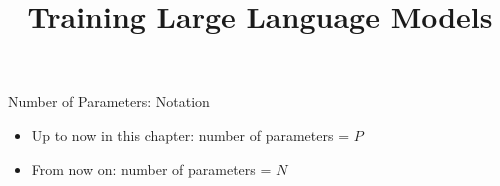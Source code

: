 



\newcommand{\learninggoals}{
\item Understand Chinchilla
\item Understand the various scaling laws
}
\def\myblue#1{\textcolor{texblue}{#1}}

\title{Training Large Language Models}
\date{}







\begin{vbframe}{Number of Parameters: Notation}

\vfill

\begin{itemize}
    \item Up to now in this chapter: number of parameters = $P$
    \item From now on: number of parameters = $N$
\end{itemize}

\vfill
    
\end{vbframe}


